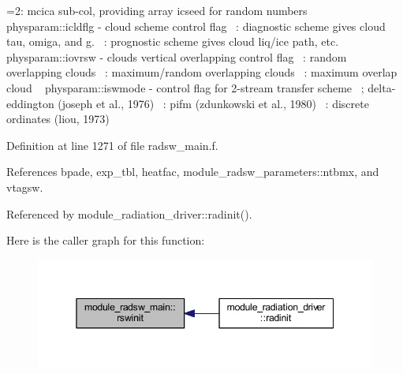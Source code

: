  =2\+: mcica sub-\/col, providing array icseed for random numbers ~\newline
 physparam\+::icldflg -\/ cloud scheme control flag ~\+: diagnostic scheme gives cloud tau, omiga, and g. ~\+: prognostic scheme gives cloud liq/ice path, etc. ~\newline
 physparam\+::iovrsw -\/ clouds vertical overlapping control flag ~\+: random overlapping clouds ~\+: maximum/random overlapping clouds ~\+: maximum overlap cloud ~\newline
 physparam\+::iswmode -\/ control flag for 2-\/stream transfer scheme ~; delta-\/eddington (joseph et al., 1976) ~\+: pifm (zdunkowski et al., 1980) ~\+: discrete ordinates (liou, 1973) 

Definition at line 1271 of file radsw\+\_\+main.\+f.



References bpade, exp\+\_\+tbl, heatfac, module\+\_\+radsw\+\_\+parameters\+::ntbmx, and vtagsw.



Referenced by module\+\_\+radiation\+\_\+driver\+::radinit().



Here is the caller graph for this function\+:
\nopagebreak
\begin{figure}[H]
\begin{center}
\leavevmode
\includegraphics[width=345pt]{group__module__radsw__main_ga9288a5da63d182f20c99e0044ca52f29_icgraph}
\end{center}
\end{figure}


